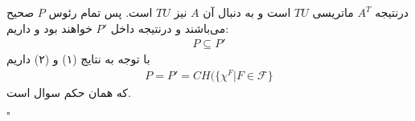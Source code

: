 \documentclass[a4paper,12pt]{article}
\begin{document}
درنتیجه $A^T$ ماتریسی $TU$ است و به دنبال آن $A$ نیز $TU$ است.
پس تمام رئوس $P$ صحیح می‌باشند و درنتیجه داخل $P'$ خواهند بود و داریم:
\begin{align}
	P \subseteq P'
\end{align}
با توجه به نتایج (۱) و (۲) داریم
\begin{align*}
	P = P' = CH(\{\chi^F | F \in \mathcal{F} \}
\end{align*}
که همان حکم سوال است.
\begin{latin}
	$\square$
\end{latin}
\end{document}

